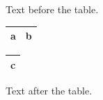 \documentclass{article}
\begin{document}
Text before the table.

{\setlength{\arrayrulewidth}{1pt}\begin{tabular}{|l|r|}\hline a & b\\\hline\end{tabular}} \begin{tabular}{|l|}\hline c\\\hline\end{tabular}

Text after the table.
\end{document}
